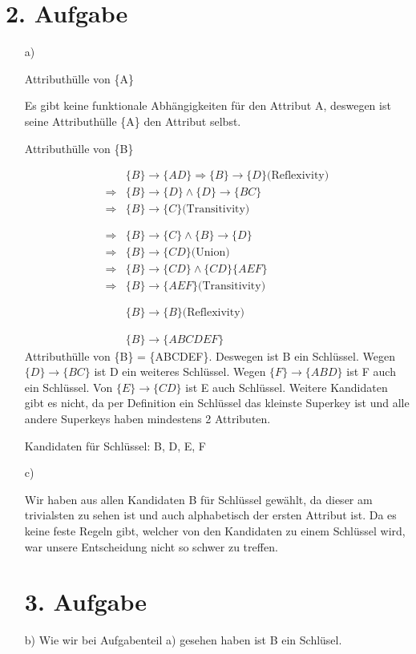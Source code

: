 \section*{2. Aufgabe}

\begin{itemize}

\item[a)]

Attributhülle von \{A\}

Es gibt keine funktionale Abhängigkeiten für den Attribut A, deswegen ist seine Attributhülle \{A\} den Attribut selbst. 

Attributhülle von \{B\}

\begin{align*}
& \{B\} \rightarrow \{AD\} \Rightarrow \{B\} \rightarrow \{D\} \text{(Reflexivity)} \\
\Rightarrow & \{B\} \rightarrow \{D\} \land \{D\} \rightarrow \{BC\} \\
\Rightarrow & \{B\} \rightarrow \{C\} \text{(Transitivity)} \\ \\ \\
%
\Rightarrow & \{B\} \rightarrow \{C\} \land \{B\} \rightarrow \{D\} \\
\Rightarrow & \{B\} \rightarrow \{CD\} \text{(Union)} \\
\Rightarrow & \{B\} \rightarrow \{CD\} \land \{CD\} \{AEF\} \\
\Rightarrow & \{B\} \rightarrow \{AEF\} \text{(Transitivity)} \\ \\ \\
%
& \{B\} \rightarrow \{B\} \text{(Reflexivity)} \\ \\ \\
%
& \{B\} \rightarrow \{ABCDEF\}
\end{align*}
Attributhülle von \{B\} = \{ABCDEF\}. Deswegen ist B ein Schlüssel. Wegen $\{D\} \rightarrow \{BC\}$ ist D ein weiteres Schlüssel. Wegen $\{F\} \rightarrow \{ABD\}$ ist F auch ein Schlüssel. Von $\{E\} \rightarrow \{CD\}$ ist E auch Schlüssel. Weitere Kandidaten gibt es nicht, da per Definition ein Schlüssel das kleinste Superkey ist und alle andere Superkeys haben mindestens 2 Attributen.

Kandidaten für Schlüssel: B, D, E, F

\item[c)]

Wir haben aus allen Kandidaten B für Schlüssel gewählt, da dieser am trivialsten zu sehen ist und auch alphabetisch der ersten Attribut ist. Da es keine feste Regeln gibt, welcher von den Kandidaten zu einem Schlüssel wird, war unsere Entscheidung nicht so schwer zu treffen.

\section*{3. Aufgabe}

\item[b)]
Wie wir bei Aufgabenteil a) gesehen haben ist B ein Schlüsel.


\end{itemize}





